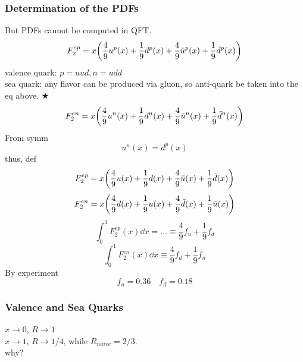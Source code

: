 \documentclass[a4paper]{article}
\DeclareMathOperator{\ra}{\rightarrow}
\numberwithin{equation}{section}
\begin{document}
\subsubsection{Determination of the PDFs}
But PDFs cannot be computed in QFT.
\begin{equation}\label{key}
F_2^{ep} = x\qty(\dfrac{4}{9}u^p(x) + \dfrac{1}{9}d^p(x) + \dfrac{4}{9}\bar{u}^p(x) + \dfrac{1}{9}\bar{d}^p(x))
\end{equation}
valence quark: $ p = uud, n = udd $\\
sea quark: any flavor can be produced via gluon, so anti-quark be taken into the eq above. $ \bigstar $\\
\begin{equation}\label{key}
F_2^{en} = x\qty(\dfrac{4}{9}u^n(x) + \dfrac{1}{9}d^n(x) + \dfrac{4}{9}\bar{u}^n(x) + \dfrac{1}{9}\bar{d}^n(x))
\end{equation}
From symm
\begin{equation}\label{key}
u^n(x) = d^p(x)
\end{equation}
thus, def
\begin{equation}\label{key}
F_2^{ep} = x\qty(\dfrac{4}{9}u(x) + \dfrac{1}{9}d(x) + \dfrac{4}{9}\bar{u}(x) + \dfrac{1}{9}\bar{d}(x))
\end{equation}
\begin{equation}\label{key}
F_2^{en} = x\qty(\dfrac{4}{9}d(x) + \dfrac{1}{9}u(x) + \dfrac{4}{9}\bar{d}(x) + \dfrac{1}{9}\bar{u}(x))
\end{equation}
\begin{equation}\label{key}
\int_0^1 F_2^{ep}(x)\dd x = ... \equiv \dfrac{4}{9}f_u + \dfrac{1}{9}f_d
\end{equation}
\begin{equation}\label{key}
\int_0^1 F_2^{en}(x)\dd x \equiv \dfrac{4}{9}f_d + \dfrac{1}{9}f_n
\end{equation}
By experiment
\begin{equation}\label{key}
f_u = 0.36 \quad f_d = 0.18
\end{equation}

\subsubsection{Valence and Sea Quarks}

$ x\ra 0 $, $ R \ra 1 $\\
$ x \ra 1 $, $ R \ra 1/4 $, while $ R_{naive} = 2/3 $.\\
why?
\end{document}
